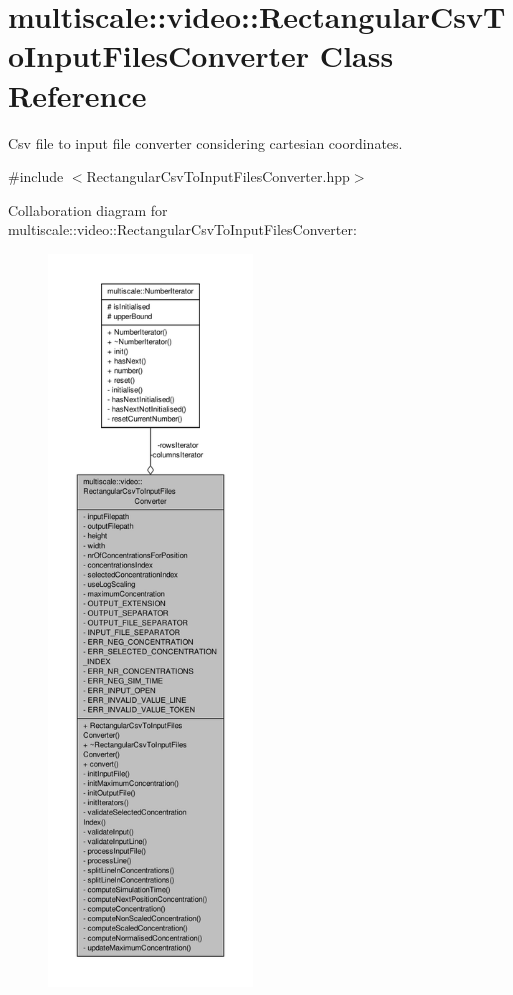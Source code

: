 \hypertarget{classmultiscale_1_1video_1_1RectangularCsvToInputFilesConverter}{\section{multiscale\-:\-:video\-:\-:Rectangular\-Csv\-To\-Input\-Files\-Converter Class Reference}
\label{classmultiscale_1_1video_1_1RectangularCsvToInputFilesConverter}
}


Csv file to input file converter considering cartesian coordinates.  




{\ttfamily \#include $<$Rectangular\-Csv\-To\-Input\-Files\-Converter.\-hpp$>$}



Collaboration diagram for multiscale\-:\-:video\-:\-:Rectangular\-Csv\-To\-Input\-Files\-Converter\-:
\nopagebreak
\begin{figure}[H]
\begin{center}
\leavevmode
\includegraphics[height=550pt]{classmultiscale_1_1video_1_1RectangularCsvToInputFilesConverter__coll__graph}
\end{center}
\end{figure}
